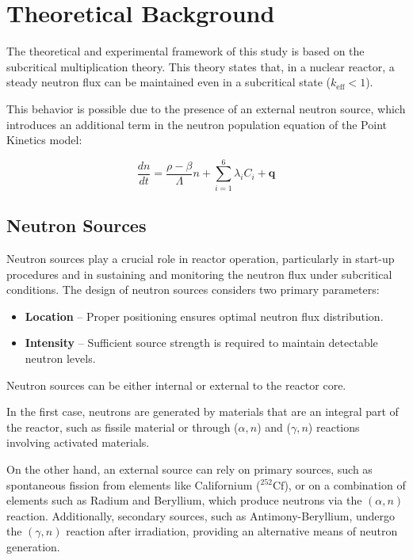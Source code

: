 \section{Theoretical Background}

The theoretical and experimental framework of this study is based on the subcritical multiplication theory. This theory states that, in a nuclear reactor, a steady neutron flux can be maintained even in a subcritical state ($ k_{\text{eff}} < 1 $). 

This behavior is possible due to the presence of an external neutron source, which introduces an additional term in the neutron population equation of the Point Kinetics model:

\begin{equation}
\frac{dn}{dt} = \frac{\rho - \beta}{\Lambda} n + \sum_{i=1}^{6} \lambda_i C_i + \mathbf{q}
\end{equation}

\subsection{Neutron Sources}

Neutron sources play a crucial role in reactor operation, particularly in start-up procedures and in sustaining and monitoring the neutron flux under subcritical conditions. The design of neutron sources considers two primary parameters:
\begin{itemize}
    \item \textbf{Location} – Proper positioning ensures optimal neutron flux distribution.
    \item \textbf{Intensity} – Sufficient source strength is required to maintain detectable neutron levels.
\end{itemize}

Neutron sources can be either internal or external to the reactor core. 

In the first case, neutrons are generated by materials that are an integral part of the reactor, such as fissile material or through ($\alpha, n$) and ($\gamma, n$) reactions involving activated materials. 

On the other hand, an external source can rely on primary sources, such as spontaneous fission from elements like Californium ($^{252}\text{Cf}$), or on a combination of elements such as Radium and Beryllium, which produce neutrons via the $(\alpha, n)$ reaction. Additionally, secondary sources, such as Antimony-Beryllium, undergo the $(\gamma, n)$ reaction after irradiation, providing an alternative means of neutron generation.


